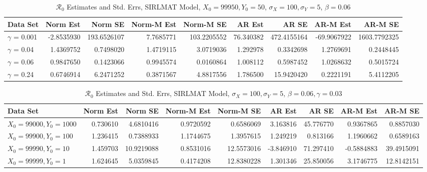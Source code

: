 \documentclass[12pt]{article}
\newcommand{\rr}{\ensuremath{\mathcal{R}_0}}
\begin{document}
\begin{table}[H]
	
	\caption{\label{tab:}$\rr$ Estimates and Std. Errs, SIRLMAT Model,
		$X_0 = 99950, Y_0 = 50$, $\sigma_X = 100, \sigma_Y = 5$, $\beta = 0.06$}
	\centering
	\begin{footnotesize}
		\begin{tabular}[t]{l|r|r|r|r|r|r|r|r}
			\hline
			Data Set & Norm Est & Norm SE & Norm-M Est & Norm-M SE & AR Est & AR SE & AR-M Est & AR-M SE\\
			\hline
			$\gamma$ = 0.001 & -2.8535930 & 193.6526107 & 7.7685771 & 103.2205552 & 76.340382 & 472.4155164 & -69.9067922 & 1603.7792325\\
			\hline
			$\gamma$ = 0.04 & 1.4369752 & 0.7498020 & 1.4719115 & 3.0719036 & 1.292978 & 0.3342698 & 1.2769691 & 0.2448445\\
			\hline
			$\gamma$ = 0.06 & 0.9847650 & 0.1423066 & 0.9945574 & 0.0160864 & 1.008112 & 0.5987452 & 1.0268632 & 0.5015724\\
			\hline
			$\gamma$ = 0.24 & 0.6746914 & 6.2471252 & 0.3871567 & 4.8817556 & 1.786500 & 15.9420420 & 0.2221191 & 5.4112205\\
			\hline
		\end{tabular}
	\end{footnotesize}
\end{table}

\begin{table}[H]
	
	\caption{\label{tab:}$\rr$ Estimates and Std. Errs, SIRLMAT Model,
		$\sigma_X = 100, \sigma_Y = 5$, $\beta = 0.06, \gamma = 0.03$}
	\centering
	\begin{footnotesize}
		\begin{tabular}[t]{l|r|r|r|r|r|r|r|r}
			\hline
			Data Set & Norm Est & Norm SE & Norm-M Est & Norm-M SE & AR Est & AR SE & AR-M Est & AR-M SE\\
			\hline
			$X_0 = 99000, Y_0 = 1000$ & 0.730610 & 4.6810416 & 0.9720592 & 0.6586069 & 3.163816 & 45.776770 & 0.9367865 & 0.8857030\\
			\hline
			$X_0 = 99900, Y_0 = 100$ & 1.236415 & 0.7388933 & 1.1744675 & 1.3957615 & 1.249219 & 0.813166 & 1.1960662 & 0.6589163\\
			\hline
			$X_0 = 99990, Y_0 = 10$ & 1.459703 & 10.9219088 & 0.8531016 & 12.5573016 & -3.846910 & 71.297410 & -0.5884883 & 39.4915091\\
			\hline
			$X_0 = 99999, Y_0 = 1$ & 1.624645 & 5.0359845 & 0.4174208 & 12.8380228 & 1.301346 & 25.850056 & 3.1746775 & 12.8142151\\
			\hline
		\end{tabular}
	\end{footnotesize}
\end{table}
\end{document}
